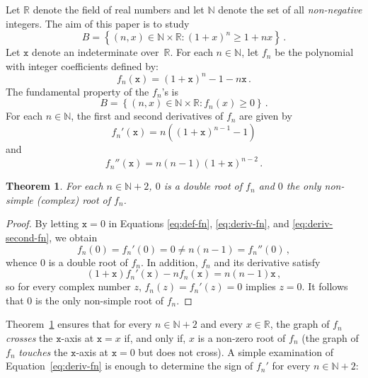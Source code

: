 \documentclass[12pt]{article}
\newcommand{\bR}{\mathbb{R}}
\newcommand{\bN}{\mathbb{N}}
\newcommand{\ttx}{\mathtt{x}}
\newtheorem{theorem}{Theorem}
\begin{document}
\sloppy

Let $\bR$ denote the field of real numbers and let $\bN$ denote the set of all \emph{non-negative} integers.
The aim of this paper is to study 
$$
B = \left\{ (n, x) \in \bN \times \bR : {(1 + x)}^n \ge 1 + n x \right\} \, . 
$$
Let $\ttx$ denote an indeterminate over~$\bR$.
For each $n \in \bN$, let $f_n$ be the polynomial with integer coefficients defined by:
\begin{equation} \label{eq:def-fn}
f_n(\ttx) = {(1 + \ttx)}^n - 1 - n \ttx  \,.
\end{equation}
The fundamental property of the $f_n$'s is  
$$
B = \left\{ (n, x) \in \bN \times \bR : f_n(x) \ge 0 \right\} \, . 
$$
For each $n \in \bN$, the first and second derivatives of $f_n$ are given by
\begin{equation} \label{eq:deriv-fn} 
  f_n'(\ttx)  = n \left( {(1 + \ttx)}^{n - 1} -  1 \right) 
\end{equation}
and
\begin{equation} \label{eq:deriv-second-fn}
f_n''(\ttx)  = n (n - 1) {(1 + \ttx)}^{n - 2} \, .
\end{equation}

\begin{theorem} \label{thm:root-mult}
  For each $n \in \bN + 2$,
  $0$ is a double root of $f_n$ and $0$ the only non-simple (complex) root of $f_n$.
\end{theorem}

\begin{proof}
  By letting $\ttx = 0$ in Equations \eqref{eq:def-fn}, \eqref{eq:deriv-fn}, and \eqref{eq:deriv-second-fn},
  we obtain 
  $$
  f_n(0) = f_n'(0) = 0 \ne n (n - 1) = f_n''(0) \, ,
  $$
  whence $0$ is a double root of $f_n$.
  In addition, $f_n$ and its derivative satisfy 
   $$
   (1 + \ttx) f_n'(\ttx) - n f_n(\ttx) = n (n - 1) \ttx \, ,
   $$
   so for every complex number $z$, $f_n(z) = f_n'(z) = 0$ implies $z = 0$.
   It follows that $0$ is the only non-simple root of $f_n$.
 \end{proof}
 
 Theorem~\ref{thm:root-mult} ensures that
for every $n \in \bN + 2$ and every $x \in \bR$, 
the graph of $f_n$ \emph{crosses} the $\ttx$-axis at $\ttx = x$ if, and only if, $x$ is a non-zero root of $f_n$
(the graph of $f_n$ \emph{touches} the $\ttx$-axis at $\ttx = 0$ but does not cross).
A simple examination of Equation~\eqref{eq:deriv-fn} is enough to determine the sign of $f_n'$ for every $n \in \bN + 2$:
\end{document}
